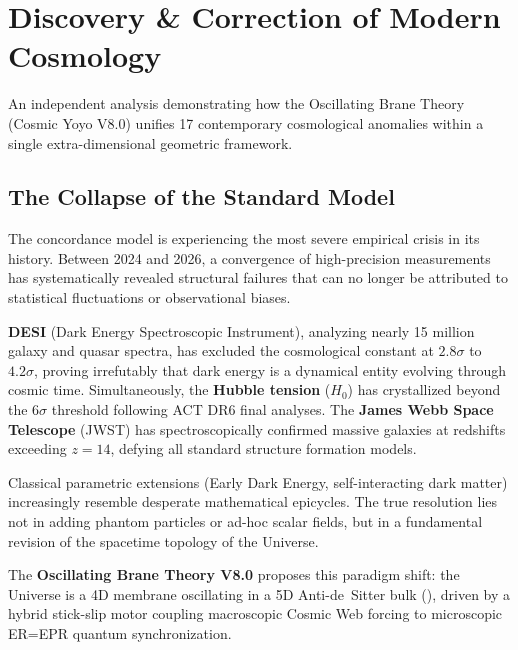 
\chapter{Discovery \& Correction of Modern Cosmology}
\label{ch:discovery}

An independent analysis demonstrating how the Oscillating Brane Theory (Cosmic Yoyo V8.0) unifies 17 contemporary cosmological anomalies within a single extra-dimensional geometric framework.

\section{The Collapse of the Standard Model}
\label{sec:collapse}

The \LCDM{} concordance model is experiencing the most severe empirical crisis in its history. Between 2024 and 2026, a convergence of high-precision measurements has systematically revealed structural failures that can no longer be attributed to statistical fluctuations or observational biases.

\textbf{DESI} (Dark Energy Spectroscopic Instrument), analyzing nearly 15 million galaxy and quasar spectra, has excluded the cosmological constant at $2.8\sigma$ to $4.2\sigma$, proving irrefutably that dark energy is a dynamical entity evolving through cosmic time. Simultaneously, the \textbf{Hubble tension} ($H_0$) has crystallized beyond the $6\sigma$ threshold following ACT DR6 final analyses. The \textbf{James Webb Space Telescope} (JWST) has spectroscopically confirmed massive galaxies at redshifts exceeding $z = 14$, defying all standard structure formation models.

Classical parametric extensions (Early Dark Energy, self-interacting dark matter) increasingly resemble desperate mathematical epicycles. The true resolution lies not in adding phantom particles or ad-hoc scalar fields, but in a fundamental revision of the spacetime topology of the Universe.

The \textbf{Oscillating Brane Theory V8.0} proposes this paradigm shift: the Universe is a 4D membrane oscillating in a 5D Anti-de~Sitter bulk (\AdS), driven by a hybrid stick-slip motor coupling macroscopic Cosmic Web forcing to microscopic ER=EPR quantum synchronization.

